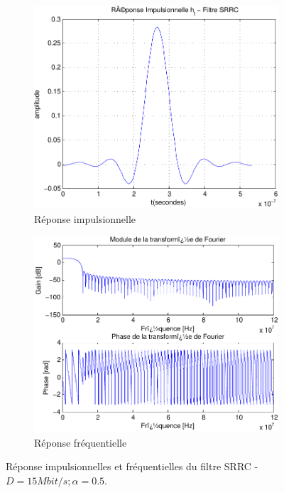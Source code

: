 \documentclass[a4paper,11pt]{article}
\begin{document}
\begin{figure}
	\begin{subfigure}{.5\textwidth}
  		\centering
  		\includegraphics[width=1\linewidth]{impul_srrc_15-crop.pdf}
  		\caption{Réponse impulsionnelle}
  		\label{fig:srrc_impul15M}
	\end{subfigure}
	\begin{subfigure}{.5\textwidth}
  		\centering
  		\includegraphics[width=1\linewidth]{frec_srrc_15-crop.pdf}
  		\caption{Réponse fréquentielle}
  		\label{fig:srrc_frec15M}
	\end{subfigure}%
	\caption{Réponse impulsionnelles et fréquentielles du filtre SRRC - $D=15 Mbit/s ; \alpha =0.5$.}
	\label{fig:srrc15M}
\end{figure}
\end{document}
